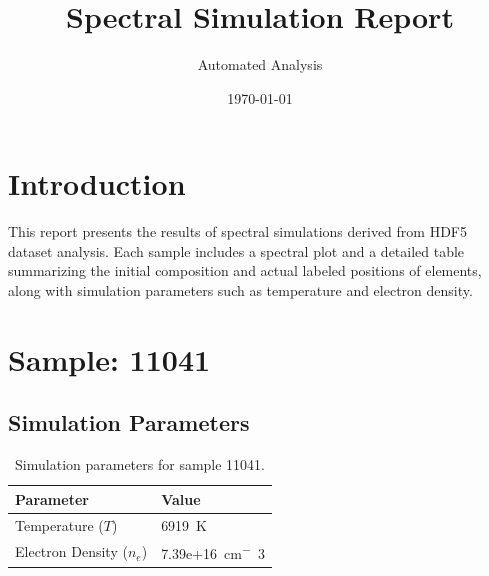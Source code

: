 \documentclass[a4paper,11pt]{article}
\title{Spectral Simulation Report}
\author{Automated Analysis}
\date{\today}
\begin{document}
\maketitle
\tableofcontents
\clearpage

\section{Introduction}
This report presents the results of spectral simulations derived from HDF5 dataset analysis. Each sample includes a spectral plot and a detailed table summarizing the initial composition and actual labeled positions of elements, along with simulation parameters such as temperature and electron density.


\section{Sample: 11041}
\subsection{Simulation Parameters}
\begin{table}[h!]
    \centering
    \begin{tabular}{ll}
        \toprule
        \textbf{Parameter} & \textbf{Value} \\
        \midrule
        Temperature ($T$) & 6919 \,\si{K} \\
        Electron Density ($n_e$) & 7.39e+16 \,\si{cm^-3} \\
        \bottomrule
    \end{tabular}
    \caption{Simulation parameters for sample 11041.}
    \label{tab:params_11041}
\end{table}
\end{document}
